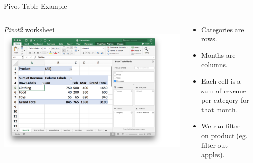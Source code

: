 \documentclass[xcolor=svgnames, handout]{beamer}
\begin{document}
\begin{frame}{Pivot Table Example}
\begin{columns}[T] %
\begin{column}{.48\textwidth}
\textit{Pivot2} worksheet
{\includegraphics[width=1.2\textwidth]{pivotExample}}
\end{column}%
\hfill%
\begin{column}{.48\textwidth}
\vspace{1em}
\begin{itemize}
\item Categories are rows.
\item Months are columns.
\item Each cell is a sum of revenue per category for that month.
\item We can filter on product (eg. filter out apples).
\end{itemize}
\end{column}%
\end{columns}
\end{frame}
\end{document}
